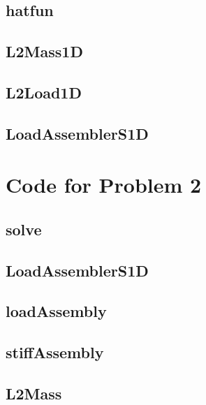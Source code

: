 \documentclass[11pt]{article}
\begin{document}
\subsection{hatfun}\label{code:hatfun}

\subsection{L2Mass1D}\label{code:L2Mass1D}

\subsection{L2Load1D}\label{code:L2Load1D}

\subsection{LoadAssemblerS1D}\label{code:LoadAssemblerS1D}

\section{Code for Problem 2}
\subsection{solve}\label{code:solve}

\subsection{LoadAssemblerS1D}\label{code:LoadAssemblerS1D}

\subsection{loadAssembly}\label{code:loadAssembly}

\subsection{stiffAssembly}\label{code:stiffAssembly}

\subsection{L2Mass}\label{code:L2Mass1D}
\end{document}
